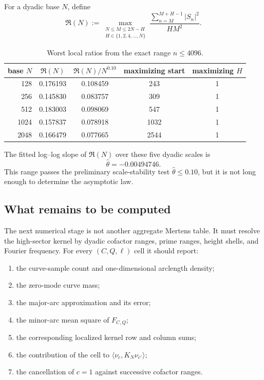 \documentclass[11pt]{article}
\theoremstyle{definition}
\theoremstyle{remark}
\newcommand{\1}{\mathbf{1}}
\begin{document}
For a dyadic base $N$, define
\begin{equation}
 \mathfrak R(N)
 :=
 \max_{\substack{
 N\le M\le2N-H\\
 H\in\{1,2,4,\ldots,N\}
 }}
 \frac{\sum_{n=M}^{M+H-1}|S_n|^2}{HM^2}.
 \label{eq:worst-local-ratio}
\end{equation}

\begin{table}[htbp]
\centering
\caption{Worst local ratios from the exact range $n\le4096$.}
\label{tab:local-ratios}
\small
\begin{tabular}{rcccc}
\toprule
base $N$ &
$\mathfrak R(N)$ &
$\mathfrak R(N)/N^{0.10}$ &
maximizing start &
maximizing $H$\\
\midrule
128  & 0.176193 & 0.108459 & 243  & 1\\
256  & 0.145830 & 0.083757 & 309  & 1\\
512  & 0.183003 & 0.098069 & 547  & 1\\
1024 & 0.157837 & 0.078918 & 1032 & 1\\
2048 & 0.166479 & 0.077665 & 2544 & 1\\
\bottomrule
\end{tabular}
\end{table}

The fitted log--log slope of $\mathfrak R(N)$ over these five dyadic
scales is
\begin{equation}
 \widehat\theta=-0.00494746.
 \label{eq:local-slope}
\end{equation}
This range passes the preliminary scale-stability test
$\widehat\theta\le0.10$, but it is not long enough to determine the
asymptotic law.

\subsection{What remains to be computed}

The next numerical stage is not another aggregate Mertens table.  It
must resolve the high-sector kernel by dyadic cofactor ranges, prime
ranges, height shells, and Fourier frequency.  For every
$(C,Q,\ell)$ cell it should report:

\begin{enumerate}[leftmargin=1.7em,itemsep=0.3em]
\item the curve-sample count and one-dimensional arclength density;
\item the zero-mode curve mass;
\item the major-arc approximation and its error;
\item the minor-arc mean square of $F_{C,Q}$;
\item the corresponding localized kernel row and column sums;
\item the contribution of the cell to
      $\langle\nu_c,K_N\nu_{c'}\rangle$;
\item the cancellation of $c=1$ against successive cofactor ranges.
\end{enumerate}
\end{document}
